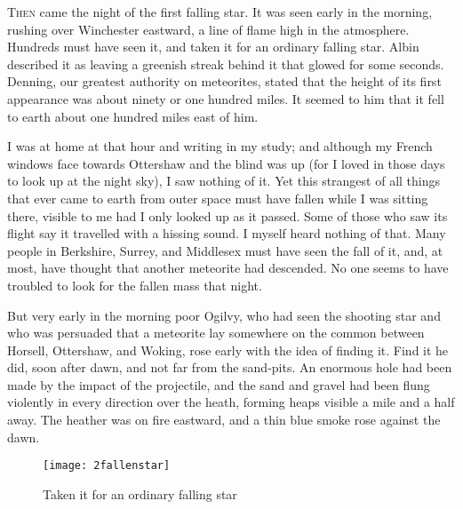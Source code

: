 





\lettrine[lines=4]{T}{hen} came the night of the first falling star. It was seen early in the morning, rushing over Winchester eastward, a line of flame high in the atmosphere. Hundreds must have seen it, and taken it for an ordinary falling star. Albin described it as leaving a greenish streak behind it that glowed for some seconds. Denning, our greatest authority on meteorites, stated that the height of its first appearance was about ninety or one hundred miles. It seemed to him that it fell to earth about one hundred miles east of him.

I was at home at that hour and writing in my study; and although my French windows face towards Ottershaw and the blind was up (for I loved in those days to look up at the night sky), I saw nothing of it. Yet this strangest of all things that ever came to earth from outer space must have fallen while I was sitting there, visible to me had I only looked up as it passed. Some of those who saw its flight say it travelled with a hissing sound. I myself heard nothing of that. Many people in Berkshire, Surrey, and Middlesex must have seen the fall of it, and, at most, have thought that another meteorite had descended. No one seems to have troubled to look for the fallen mass that night.

But very early in the morning poor Ogilvy, who had seen the shooting star and who was persuaded that a meteorite lay somewhere on the common between Horsell, Ottershaw, and Woking, rose early with the idea of finding it. Find it he did, soon after dawn, and not far from the sand-pits. An enormous hole had been made by the impact of the projectile, and the sand and gravel had been flung violently in every direction over the heath, forming heaps visible a mile and a half away. The heather was on fire eastward, and a thin blue smoke rose against the dawn.


\begin{sidewaysfigure}
\texttt{[image: 2fallenstar]}%
\caption{Taken it for an ordinary falling star}
\end{sidewaysfigure}

